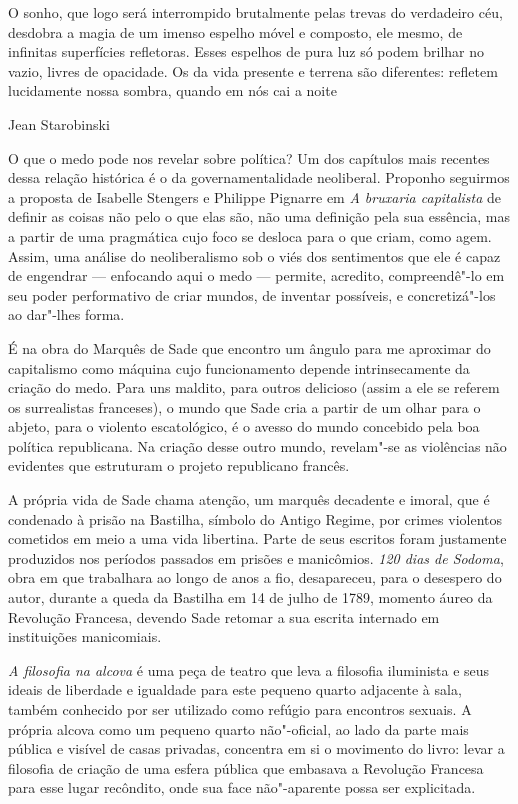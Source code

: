 \epigraph{O sonho, que logo será interrompido brutalmente pelas trevas do
verdadeiro céu, desdobra a magia de um imenso espelho móvel e composto,
ele mesmo, de infinitas superfícies refletoras. Esses espelhos de pura
luz só podem brilhar no vazio, livres de opacidade. Os da vida presente
e terrena são diferentes: refletem lucidamente nossa sombra, quando em
nós cai a noite}{Jean Starobinski}

O que o medo pode nos revelar sobre política? Um dos capítulos mais
recentes dessa relação histórica é o da governamentalidade neoliberal.
Proponho seguirmos a proposta de Isabelle Stengers e Philippe Pignarre em
\emph{A bruxaria capitalista} de definir as coisas não pelo o que elas
são, não uma definição pela sua essência, mas a partir de uma pragmática
cujo foco se desloca para o que criam, como agem. Assim, uma análise do
neoliberalismo sob o viés dos sentimentos que ele é capaz de engendrar ---
enfocando aqui o medo --- permite, acredito, compreendê"-lo em seu poder performativo de criar mundos, de inventar possíveis, e concretizá"-los ao dar"-lhes forma.

\asterisc

É na obra do Marquês de Sade que encontro um ângulo para me aproximar
do capitalismo como máquina cujo funcionamento depende intrinsecamente
da criação do medo. Para uns maldito, para outros delicioso (assim a ele
se referem os surrealistas franceses), o mundo que Sade cria a partir de
um olhar para o abjeto, para o violento escatológico, é o avesso do
mundo concebido pela boa política republicana. Na criação desse outro
mundo, revelam"-se as violências não evidentes que estruturam o projeto
republicano francês.

A própria vida de Sade chama atenção, um marquês decadente e imoral, que
é condenado à prisão na Bastilha, símbolo do Antigo Regime, por crimes
violentos cometidos em meio a uma vida libertina. Parte de seus escritos
foram justamente produzidos nos períodos passados em prisões e
manicômios. \emph{120 dias de Sodoma}, obra em que trabalhara ao longo
de anos a fio, desapareceu, para o desespero do autor, durante a queda
da Bastilha em 14 de julho de 1789, momento áureo da Revolução Francesa,
devendo Sade retomar a sua escrita internado em instituições
manicomiais.

\emph{A filosofia na alcova} é uma peça de teatro que leva a filosofia
iluminista e seus ideais de liberdade e igualdade para este
pequeno quarto adjacente à sala, também conhecido por ser utilizado como
refúgio para encontros sexuais. A própria alcova como um pequeno quarto
não"-oficial, ao lado da parte mais pública e visível de casas privadas,
concentra em si o movimento do livro: levar a filosofia de criação de
uma esfera pública que embasava a Revolução Francesa para esse lugar
recôndito, onde sua face não"-aparente possa ser explicitada.

